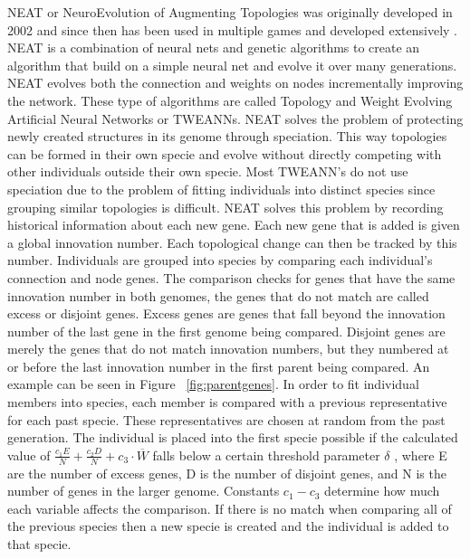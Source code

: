 \documentclass[12pt]{ucthesis} \newif\ifpdf \ifx\pdfoutput\undefined
\begin{document}
NEAT or NeuroEvolution of Augmenting Topologies was originally developed in
2002 and since then has been used in multiple games and developed extensively
\cite{stanley:phd04}. NEAT is a combination of neural nets and genetic
algorithms to create an algorithm that build on a simple neural net and evolve it over many
generations. NEAT evolves both the connection and weights on nodes incrementally
improving the network. These type of algorithms are called Topology and Weight
Evolving Artiﬁcial Neural Networks or TWEANNs. NEAT solves the problem of
protecting newly created structures in its genome through speciation. This way
topologies can be formed in their own specie and evolve without directly
competing with other individuals outside their own specie. Most TWEANN’s do not
use speciation due to the problem of fitting individuals into distinct species
since grouping similar topologies is difficult. NEAT solves this problem by
recording historical information about each new gene. Each new gene that is
added is given a global innovation number. Each topological change can then be
tracked by this number. Individuals are grouped into species by comparing each
individual's connection and node genes. The comparison checks for genes that
have the same innovation number in both genomes, the genes that do not match are
called excess or disjoint genes. Excess genes are genes that fall beyond the
innovation number of the last gene in the first genome being compared. Disjoint
genes are merely the genes that do not match innovation numbers, but they
numbered at or before the last innovation number in the first parent being
compared. An example can be seen in  Figure ~\ref{fig:parentgenes}. In order to fit
individual members into species, each member is compared with a previous
representative for each past specie. These representatives are chosen at random
from the past generation. The individual is placed into the first specie
possible if the calculated value of $\frac{c_{1}E}{N} + \frac{c_{2}D}{N} + c_{3}
\cdot \overline{W}$ falls below a certain threshold parameter $\delta$ , where E are
the number of excess genes, D is the number of disjoint genes, and N is the
number of genes in the larger genome. Constants $c_{1} - c_{3}$ determine how
much each variable affects the comparison. If there is no match when comparing all of the previous species then a new specie is created and the individual is added to that specie.
\end{document}
